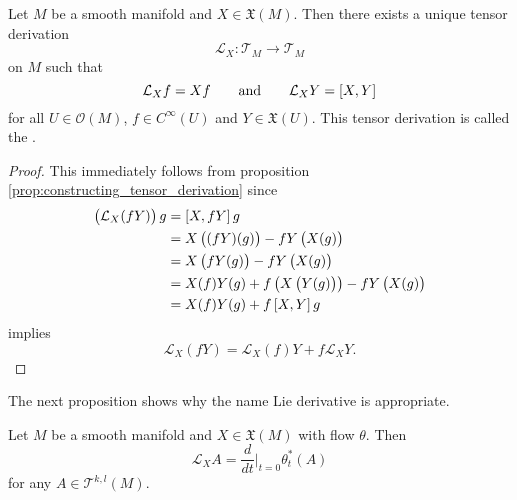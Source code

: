 \begin{theorem}
	Let $M$ be a smooth manifold and $X \in \mathfrak{X}(M)$. Then there exists a unique tensor derivation 
	\begin{equation*}
		\mathcal{L}_X : \mathcal{T}_M \to \mathcal{T}_M
	\end{equation*}
	\noindent on $M$ such that
	\begin{equation*}
		\mathcal{L}_Xf = Xf \qquad \text{and} \qquad \mathcal{L}_XY = \sbr[0]{X,Y}
	\end{equation*}
	\noindent for all $U \in \mathcal{O}(M)$, $f \in C^\infty(U)$ and $Y \in \mathfrak{X}(U)$. This tensor derivation is called the .
\end{theorem}

\begin{proof}
	This immediately follows from proposition \ref{prop:constructing_tensor_derivation} since
	\begin{align*}
		\del[1]{\mathcal{L}_X(fY)}g &= \sbr[0]{X,fY}g\\
		&= X\del[1]{(fY)(g)} - fY\del[1]{X(g)}\\
		&= X\del[1]{fY(g)} - fY\del[1]{X(g)}\\
		&= X(f)Y(g) + f \del[1]{X\del[1]{Y(g)}} -  fY\del[1]{X(g)}\\
		&= X(f)Y(g) + f \sbr[0]{X,Y}g
	\end{align*}
	\noindent implies
	\begin{equation*}
		\mathcal{L}_X(fY) = \mathcal{L}_X(f)Y + f\mathcal{L}_XY.
	\end{equation*}
\end{proof}

The next proposition shows why the name Lie derivative is appropriate.

\begin{proposition}
	Let $M$ be a smooth manifold and $X \in \mathfrak{X}(M)$ with flow $\theta$. Then
	\begin{equation*}
		\mathcal{L}_XA = \frac{d}{dt}\bigg\vert_{t = 0} \theta_t^*(A)
	\end{equation*}
	\noindent for any $A \in \mathcal{T}^{k,l}(M)$.
\end{proposition}
